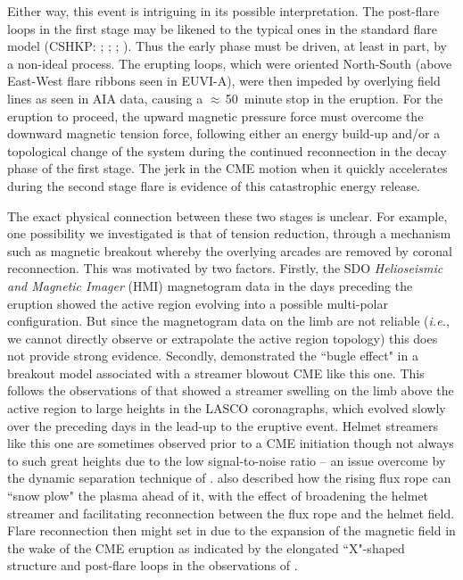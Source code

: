 \documentclass[namedreferences]{solarphysics}
\begin{document}
\begin{article}
Either way, this event is intriguing in its possible interpretation. The post-flare loops in the first stage may be likened to the typical ones in the standard flare model (CSHKP: ; ; ; ). Thus the early phase must be driven, at least in part, by a non-ideal process. The erupting loops, which were oriented North-South (above East-West flare ribbons seen in EUVI-A), were then impeded by overlying field lines as seen in AIA data, causing a $\approx$\,50~minute stop in the eruption. For the eruption to proceed, the upward magnetic pressure force must overcome the downward magnetic tension force, following either an energy build-up and/or a topological change of the system during the continued reconnection in the decay phase of the first stage. The jerk in the CME motion when it quickly accelerates during the second stage flare is evidence of this catastrophic energy release.

The exact physical connection between these two stages is unclear. For example, one possibility we investigated is that of tension reduction, through a mechanism such as magnetic breakout whereby the overlying arcades are removed by coronal reconnection. This was motivated by two factors. Firstly, the SDO \emph{Helioseismic and Magnetic Imager} (HMI) magnetogram data in the days preceding the eruption showed the active region evolving into a possible multi-polar configuration. But since the magnetogram data on the limb are not reliable (\emph{i.e.}, we cannot directly observe or extrapolate the active region topology) this does not provide strong evidence. Secondly,  demonstrated the ``bugle effect" in a breakout model associated with a streamer blowout CME like this one. This follows the observations of  that showed a streamer swelling on the limb above the active region to large heights in the LASCO coronagraphs, which evolved slowly over the preceding days in the lead-up to the eruptive event. Helmet streamers like this one are sometimes observed prior to a CME initiation \cite{1993JGR....9813177H} though not always to such great heights due to the low signal-to-noise ratio -- an issue overcome by the dynamic separation technique of .  also described how the rising flux rope can ``snow plow" the plasma ahead of it, with the effect of broadening the helmet streamer and facilitating reconnection between the flux rope and the helmet field. Flare reconnection then might set in due to the expansion of the magnetic field in the wake of the CME eruption as indicated by the elongated ``X"-shaped structure and post-flare loops in the observations of .


\end{article}
\end{document}
